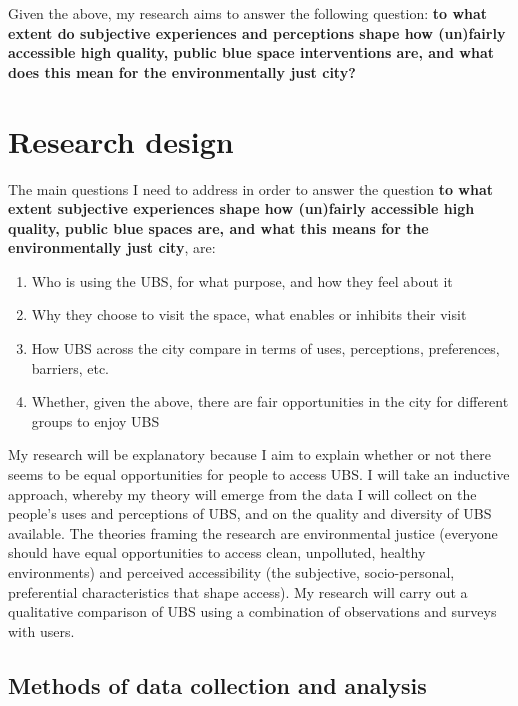 \documentclass{article}
\begin{document}
Given the above, my research aims to answer the following question: \textbf{to what extent do subjective experiences and perceptions shape how (un)fairly accessible high quality, public blue space interventions are, and what does this mean for the environmentally just city?}

\section{Research design}

The main questions I need to address in order to answer the question \textbf{to what extent subjective experiences shape how (un)fairly accessible high quality, public blue spaces are, and what this means for the environmentally just city}, are:

\begin{enumerate}
	\item Who is using the UBS, for what purpose, and how they feel about it 
	\item Why they choose to visit the space, what enables or inhibits their visit
	\item How UBS across the city compare in terms of uses, perceptions, preferences, barriers, etc.
	\item Whether, given the above, there are fair opportunities in the city for different groups to enjoy UBS
\end{enumerate}

My research will be explanatory because I aim to explain whether or not there seems to be equal opportunities for people to access UBS. I will take an inductive approach, whereby my theory will emerge from the data I will collect on the people’s uses and perceptions of UBS, and on the quality and diversity of UBS available. The theories framing the research are environmental justice (everyone should have equal opportunities to access clean, unpolluted, healthy environments) and perceived accessibility (the subjective, socio-personal, preferential characteristics that shape access). My research will carry out a qualitative comparison of UBS using a combination of observations and surveys with users.

\subsection{Methods of data collection and analysis}
\end{document}
